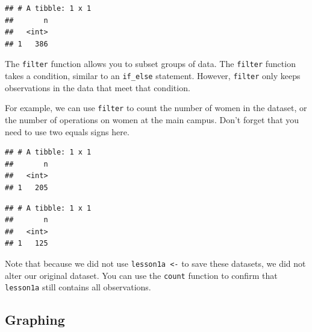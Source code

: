 \documentclass[]{book}
\newenvironment{Shaded}{\begin{snugshade}}{\end{snugshade}}
\newcommand{\CommentTok}[1]{\textcolor[rgb]{0.56,0.35,0.01}{\textit{#1}}}
\newcommand{\DecValTok}[1]{\textcolor[rgb]{0.00,0.00,0.81}{#1}}
\newcommand{\KeywordTok}[1]{\textcolor[rgb]{0.13,0.29,0.53}{\textbf{#1}}}
\newcommand{\NormalTok}[1]{#1}
\newcommand{\OperatorTok}[1]{\textcolor[rgb]{0.81,0.36,0.00}{\textbf{#1}}}
\newcommand{\StringTok}[1]{\textcolor[rgb]{0.31,0.60,0.02}{#1}}
\begin{document}
\begin{verbatim}
## # A tibble: 1 x 1
##       n
##   <int>
## 1   386
\end{verbatim}

The \texttt{filter} function allows you to subset groups of data. The \texttt{filter} function takes a condition, similar to an \texttt{if\_else} statement. However, \texttt{filter} only keeps observations in the data that meet that condition.

For example, we can use \texttt{filter} to count the number of women in the dataset, or the number of operations on women at the main campus. Don't forget that you need to use two equals signs here.

\begin{Shaded}
\end{Shaded}

\begin{verbatim}
## # A tibble: 1 x 1
##       n
##   <int>
## 1   205
\end{verbatim}

\begin{Shaded}
\end{Shaded}

\begin{verbatim}
## # A tibble: 1 x 1
##       n
##   <int>
## 1   125
\end{verbatim}

Note that because we did not use \texttt{lesson1a\ \textless{}-} to save these datasets, we did not alter our original dataset. You can use the \texttt{count} function to confirm that \texttt{lesson1a} still contains all observations.

\hypertarget{graphing}{%
\subsection{Graphing}\label{graphing}}
\end{document}
